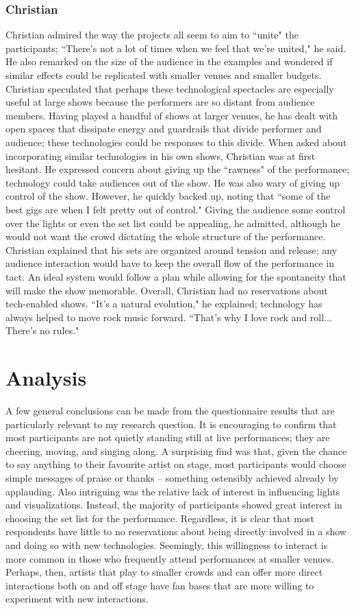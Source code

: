 \subsubsection{Christian}
Christian admired the way the projects all seem to aim to ``unite" the participants; ``There's not a lot of times when we feel that we're united," he said. He also remarked on the size of the audience in the examples and wondered if similar effects could be replicated with smaller venues and smaller budgets. Christian speculated that perhaps these technological spectacles are especially useful at large shows because the performers are so distant from audience members. Having played a handful of shows at larger venues, he has dealt with open spaces that dissipate energy and guardrails that divide performer and audience; these technologies could be responses to this divide. When asked about incorporating similar technologies in his own shows, Christian was at first hesitant. He expressed concern about giving up the ``rawness" of the performance; technology could take audiences out of the show. He was also wary of giving up control of the show. However, he quickly backed up, noting that ``some of the best gigs are when I felt pretty out of control." Giving the audience some control over the lights or even the set list could be appealing, he admitted, although he would not want the crowd dictating the whole structure of the performance. Christian explained that his sets are organized around tension and release; any audience interaction would have to keep the overall flow of the performance in tact. An ideal system would follow a plan while allowing for the spontaneity that will make the show memorable.  Overall, Christian had no reservations about tech-enabled shows. ``It's a natural evolution," he explained; technology has always helped to move rock music forward. ``That's why I love rock and roll... There's no rules." 


\section{Analysis}

A few general conclusions can be made from the questionnaire results that are particularly relevant to my research question. It is encouraging to confirm that most participants are not quietly standing still at live performances; they are cheering, moving, and singing along. A surprising find was that, given the chance to say anything to their favourite artist on stage, most participants would choose simple messages of praise or thanks -- something ostensibly achieved already by applauding. Also intriguing was the relative lack of interest in influencing lights and visualizations. Instead, the majority of participants showed great interest in choosing the set list for the performance. Regardless, it is clear that most respondents have little to no reservations about being directly involved in a show and doing so with new technologies. Seemingly, this willingness to interact is more common in those who frequently attend performances at smaller venues. Perhaps, then, artists that play to smaller crowds and can offer more direct interactions both on and off stage have fan bases that are more willing to experiment with new interactions.
